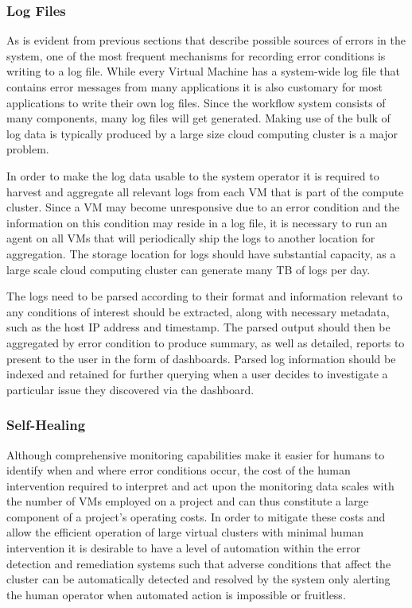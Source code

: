 \subsubsection {Log Files}

As is evident from previous sections that describe possible sources of errors in the system, one of the most frequent mechanisms for recording error conditions is writing to a log file. While every Virtual Machine has a system-wide log file that contains error messages from many applications it is also customary for most applications to write their own log files. Since the workflow system consists of many components, many log files will get generated. Making use of the bulk of log data is typically produced by a large size cloud computing cluster is a major problem.

In order to make the log data usable to the system operator it is required to harvest and aggregate all relevant logs from each VM that is part of the compute cluster. Since a VM may become unresponsive due to an error condition and the information on this condition may reside in a log file, it is necessary to run an agent on all VMs that will periodically ship the logs to another location for aggregation. The storage location for logs should have substantial capacity, as a large scale cloud computing cluster can generate many TB of logs per day.

The logs need to be parsed according to their format and information relevant to any conditions of interest should be extracted, along with necessary metadata, such as the host IP address and timestamp. The parsed output should then be aggregated by error condition to produce summary, as well as detailed, reports to present to the user in the form of dashboards. Parsed log information should be indexed and retained for further querying when a user decides to investigate a particular issue they discovered via the dashboard.

\subsubsection{Self-Healing}
\label{sec:self_healing_req}
Although comprehensive monitoring capabilities make it easier for humans to identify when and where error conditions occur, the cost of the human intervention required to interpret and act upon the monitoring data scales with the number of VMs employed on a project and can thus constitute a large component of a project's operating costs. In order to mitigate these costs and allow the efficient operation of large virtual clusters with minimal human intervention it is desirable to have a level of automation within the error detection and remediation systems such that adverse conditions that affect the cluster can be automatically detected and resolved by the system only alerting the human operator when automated action is impossible or fruitless.

